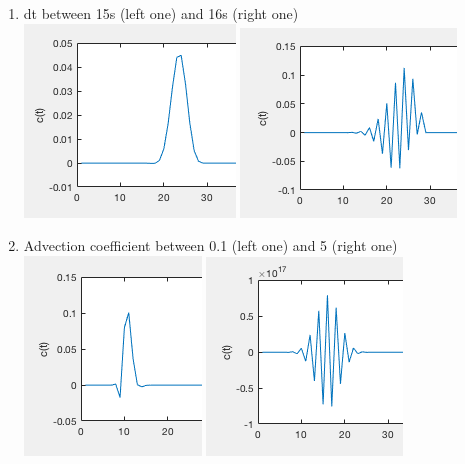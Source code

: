 \documentclass[onecolumn]{article}
\begin{document}
\begin{enumerate}
    \item dt between 15s (left one) and 16s (right one) \\
    \includegraphics[scale=1]{dt15}
	\includegraphics[scale=1]{dt16}
    
    \item Advection coefficient between 0.1 (left one) and 5 (right one) \\
    \includegraphics[scale=1]{u01}
	\includegraphics[scale=1]{u5}
    

\end{enumerate}
\end{document}
